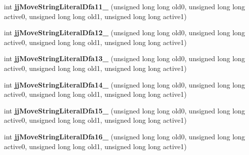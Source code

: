 \begin{DoxyCompactItemize}
\mbox{\label{classvhdl_1_1parser_1_1_vhdl_parser_token_manager_add1a4522bb6c785c3497a5c8e19b06af}} 
int {\bfseries jj\+Move\+String\+Literal\+Dfa11\+\_} (unsigned long long old0, unsigned long long active0, unsigned long long old1, unsigned long long active1)
\item 
\mbox{\label{classvhdl_1_1parser_1_1_vhdl_parser_token_manager_ae41f0ed788872df22bc48d9ee2d031e4}} 
int {\bfseries jj\+Move\+String\+Literal\+Dfa12\+\_} (unsigned long long old0, unsigned long long active0, unsigned long long old1, unsigned long long active1)
\item 
\mbox{\label{classvhdl_1_1parser_1_1_vhdl_parser_token_manager_a70d351bd7f86771787fa12836f8a88f2}} 
int {\bfseries jj\+Move\+String\+Literal\+Dfa13\+\_} (unsigned long long old0, unsigned long long active0, unsigned long long old1, unsigned long long active1)
\item 
\mbox{\label{classvhdl_1_1parser_1_1_vhdl_parser_token_manager_a42c8071ad0ed12f60daf4a7f8dda64b4}} 
int {\bfseries jj\+Move\+String\+Literal\+Dfa14\+\_} (unsigned long long old0, unsigned long long active0, unsigned long long old1, unsigned long long active1)
\item 
\mbox{\label{classvhdl_1_1parser_1_1_vhdl_parser_token_manager_aadb91db09c8657b41728b417048a974d}} 
int {\bfseries jj\+Move\+String\+Literal\+Dfa15\+\_} (unsigned long long old0, unsigned long long active0, unsigned long long old1, unsigned long long active1)
\item 
\mbox{\label{classvhdl_1_1parser_1_1_vhdl_parser_token_manager_a7af5b162ba41b1264321a9d73d97202b}} 
int {\bfseries jj\+Move\+String\+Literal\+Dfa16\+\_} (unsigned long long old0, unsigned long long active0, unsigned long long old1, unsigned long long active1)
\item 
\mbox{\label{classvhdl_1_1parser_1_1_vhdl_parser_token_manager_a6c92458e2f60d576206c0dd274ac629d}} 

\end{DoxyCompactItemize}
